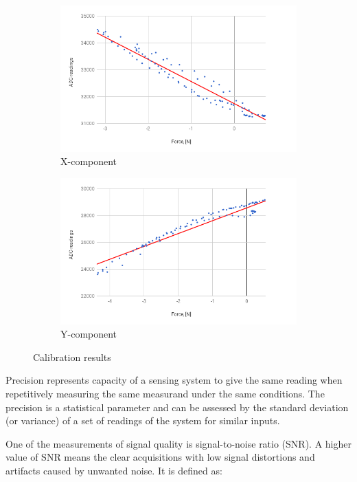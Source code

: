 		\begin{figure}
			\centering
			\begin{subfigure}
				\centering
				\includegraphics[width=120mm]{fig/results/x-dir.png}
				\caption{X-component}
				\label{fig:Xdirection}
			\end{subfigure}
			\begin{subfigure}
				\centering
				\includegraphics[width=120mm]{fig/results/y-dir.png}
				\caption{Y-component}
				\label{fig:Ydirection}
			\end{subfigure}
			\caption{Calibration results}
			\label{fig:Calibration}
		\end{figure}
Precision represents capacity of a sensing system to give the same reading when repetitively measuring the same measurand under the same conditions. The precision is a statistical parameter and can be assessed by the standard deviation (or variance) of a set of readings of the system for similar inputs.

One of the measurements of signal quality is signal-to-noise ratio (SNR). A higher value of SNR means the clear acquisitions with low signal distortions and artifacts caused by unwanted noise. It is defined as:

